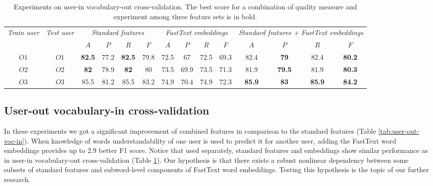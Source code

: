 \begin{table}[h]
\begin{tabular}{cc|cccc|cccc|cccc}
\multirow{2}{0.6cm}{\textit{Train user}} & \multirow{2}{0.6cm}{\textit{Test user}} & \multicolumn{4}{c|}{\textit{Standard features}} & \multicolumn{4}{c|}{\textit{FastText embeddings}} & \multicolumn{4}{X}{\textit{Standard features + FastText embeddings}} \\ \cline{3-14} 
 &  & $A$ & $P$ & $R$ & $F$ & $A$ & $P$ & $R$ & $F$ & $A$ & $P$ & $R$ & $F$ \\ \hline
$O1$ & $O1$ & \textbf{82.5} & 77.2 & \textbf{82.5} & 79.8 & 72.5 & 67 & 72.5 & 69.3 & 82.4 & \textbf{79} & 82.4 & \textbf{80.2} \\
$O2$ & $O2$ & \textbf{82} & 78.9 & \textbf{82} & 80 & 73.5 & 69.9 & 73.5 & 71.3 & 81.9 & \textbf{79.5} & 81.9 & \textbf{80.3} \\ 
$O3$ & $O3$ & 85.5 & 81.2 & 85.5 & 83.2 & 74.9 & 70.4 & 74.9 & 72.3 & \textbf{85.9} & \textbf{83} & \textbf{85.9} & \textbf{84.2} \\ \hline 
\end{tabular}
    \caption{Experiments on user-in vocabulary-out cross-validation. The best score for a combination of quality measure and experiment among three feature sets is in bold.}
    \label{tab:user-in-voc-out}
\end{table}


\subsection{User-out vocabulary-in cross-validation}


In these experiments we got a significant improvement of combined features in comparison to the standard features (Table \ref{tab:user-out-voc-in}). When knowledge of words understandability of one user is used to predict it for another user, adding the FastText word embeddings provides up to 2.9 better F1 score. Notice that used separately, standard features and embeddings show similar performance as in user-in vocabulary-out cross-validation (Table \ref{tab:user-in-voc-out}). Our hypothesis is that there exists a robust nonlinear dependency between some subsets of standard features and subword-level components of FastText word embeddings. Testing this hypothesis is the topic of our further research.

